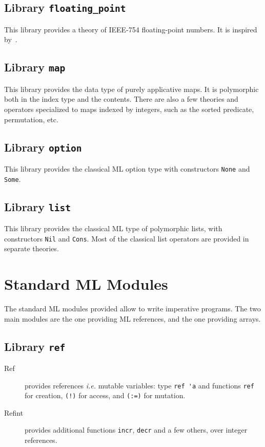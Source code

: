 \subsection{Library \texttt{floating\_point}}

This library provides a theory of IEEE-754 floating-point numbers. It
is inspired by~\cite{ayad10ijcar}.

\subsection{Library \texttt{map}}

This library provides the data type of purely applicative maps. It is
polymorphic both in the index type and the contents. There are also a
few theories and operators specialized to maps indexed by integers,
such as the sorted predicate, permutation, etc.

\subsection{Library \texttt{option}}

This library provides the classical ML option type with constructors
\verb|None| and \verb|Some|.

\subsection{Library \texttt{list}}

This library provides the classical ML type of polymorphic lists, with
constructors \verb|Nil| and \verb|Cons|. Most of the classical list
operators are provided in separate theories.

\section{Standard ML Modules}
\label{sec:mllibrary}

The standard ML modules provided allow to write imperative
programs. The two main modules are the one providing ML references,
and the one providing arrays.

\subsection{Library \texttt{ref}}


\begin{description}
\item[Ref] provides references \emph{i.e.} mutable variables:
  type \verb|ref 'a| and functions \verb|ref| for creation,
  \verb|(!)| for access, and \verb|(:=)| for mutation.
\item[Refint] provides additional functions \texttt{incr},
  \texttt{decr} and a few others, over integer references.
\end{description}
\indextt{:=}

